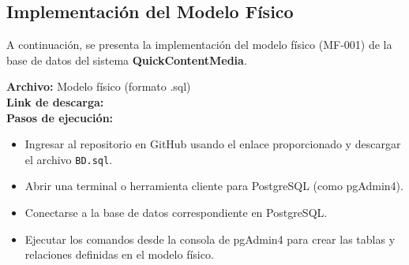 \subsection{Implementación del Modelo Físico}
A continuación, se presenta la implementación del modelo físico (MF-001) de la base de datos del sistema \textbf{QuickContentMedia}.

\textbf{Archivo:} Modelo físico (formato .sql) \\
\textbf{Link de descarga:} \linkModeloFisico \\

\textbf{Pasos de ejecución:}
\begin{itemize}
    \item Ingresar al repositorio en GitHub usando el enlace proporcionado y descargar el archivo \texttt{BD.sql}.
    \item Abrir una terminal o herramienta cliente para PostgreSQL (como pgAdmin4).
    \item Conectarse a la base de datos correspondiente en PostgreSQL.
    \item Ejecutar los comandos desde la consola de pgAdmin4 para crear las tablas y relaciones definidas en el modelo físico.
\end{itemize}